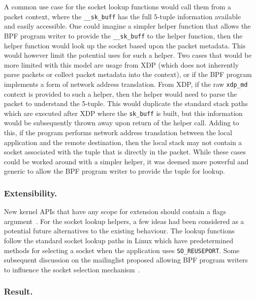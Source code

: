 \documentclass[10pt,sigconf,authorversion]{lpc}
\begin{document}
A common use case for the socket lookup functions would call them from a packet
context, where the \verb+__sk_buff+ has the full 5-tuple information available
and easily accessible. One could imagine a simpler helper function that allows
the BPF program writer to provide the \verb+__sk_buff+ to the helper function,
then the helper function would look up the socket based upon the packet
metadata. This would however limit the potential uses for such a helper. Two
cases that would be more limited with this model are usage from XDP (which does
not inherently parse packets or collect packet metadata into the context), or
if the BPF program implements a form of network address translation. From XDP,
if the raw \verb+xdp_md+ context is provided to such a helper, then the helper
would need to parse the packet to understand the 5-tuple. This would duplicate
the standard stack paths which are executed after XDP where the \verb+sk_buff+
is built, but this information would be subsequently thrown away upon return of
the helper call. Adding to this, if the program performs network address
translation between the local application and the remote destination, then the
local stack may not contain a socket associated with the tuple that is directly
in the packet. While these cases could be worked around with a simpler helper,
it was deemed more powerful and generic to allow the BPF program writer to
provide the tuple for lookup.

\subsubsection{Extensibility.}

New kernel APIs that have any scope for extension should contain a flags
argument~\cite{syscall-flags}. For the socket lookup helpers, a few ideas had
been considered as a potential future alternatives to the existing behaviour.
The lookup functions follow the standard socket lookup paths in Linux which
have predetermined methods for selecting a socket when the application uses
\verb+SO_REUSEPORT+. Some subsequent discussion on the mailinglist proposed
allowing BPF program writers to influence the socket selection
mechanism~\cite{netdev-sk-select}.

\subsubsection{Result.}
\end{document}
